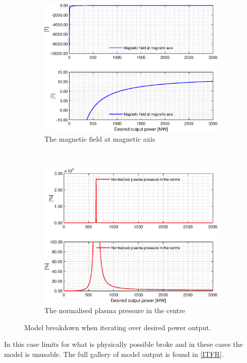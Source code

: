 \begin{figure}
	\centering
  \begin{subfigure}[b]{.46\textwidth}
    \includegraphics[width=\textwidth]{MatlabFigures/PE/f7.eps}
    \caption{The magnetic field at magnetic axis\vspace{\baselineskip}}
    \label{PEM}
  \end{subfigure}
  ~
  \begin{subfigure}[b]{.45\textwidth}
    \includegraphics[width=\textwidth]{MatlabFigures/PE/f8.eps}
    \caption{The normalised plasma pressure in the centre}
    \label{PEB}
  \end{subfigure}
	\caption{Model breakdown when iterating over desired power output.}
	\label{PE}
\end{figure}
In this case limits for what is physically possible broke and in these cases the model is unusable.
The full gallery of model output is found in \cref{ITFR}.
